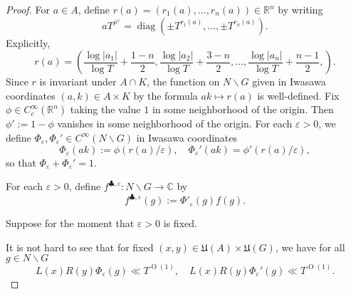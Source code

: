 \documentclass[reqno]{amsart}
\def\eps{\varepsilon}
\DeclareMathOperator{\diag}{diag}
\def\O{\operatorname{O}}
\theoremstyle{plain} \newtheorem{theorem} {Theorem}
\theoremstyle{definition} \newtheorem{definition} [theorem] {Definition}
\theoremstyle{itplain} %
\numberwithin{equation}{section}
\numberwithin{theorem}{section}
\begin{document}
\begin{proof}
  For $a \in A$, define $r(a)  = (r_1(a),\dotsc,r_n(a)) \in \mathbb{R}^n$ by writing
  \begin{equation*}
    a T^{\rho^\vee} = \diag(\pm T^{r_1(a)}, \dotsc, \pm T^{r_n(a)}).
  \end{equation*}
  Explicitly,
  \begin{equation*}
    r(a) =
    \left(
      \frac{\log |a_1|}{\log T} + \frac{1 - n}{2},
      \frac{\log |a_2|}{\log T} + \frac{3 - n}{2},
      \dotsc,
      \frac{\log |a_n|}{\log T} + \frac{n - 1}{2},
    \right).    
  \end{equation*}
  Since $r$ is invariant under $A \cap K$, the function on $N \backslash G$ given in Iwasawa coordinates $(a,k) \in A \times K$ by the formula $a k \mapsto r(a)$ is well-defined.  Fix $\phi \in C_c^\infty(\mathbb{R}^n)$ taking the value $1$ in some neighborhood of the origin.  Then $\phi ' := 1 - \phi$ vanishes in some neighborhood of the origin.  For each $\eps > 0$, we define $\Phi_\eps , \Phi_\eps ' \in C^\infty(N \backslash G)$ in Iwasawa coordinates
  \begin{equation*} 
    \Phi_\eps (a k ) := \phi(r(a)/\eps), \quad
    \Phi_\eps '(a k) = \phi '(r(a) / \eps),
  \end{equation*}
  so that $\Phi_\eps  + \Phi_\eps  ' = 1$.

  For each $\eps > 0$, define $f ^{\clubsuit, \eps} : N \backslash G \rightarrow \mathbb{C}$ by
  \begin{equation*}
    f ^{\clubsuit, \eps }(g) := \Phi'_\eps (g) f(g).
  \end{equation*}

  Suppose for the moment that $\eps > 0$ is fixed.

  It is not hard to see that for fixed $(x,y) \in \mathfrak{U}(A) \times \mathfrak{U}(G)$, we have for all $g \in N \backslash G$
  \begin{equation}\label{eq:lx-ry-phi_eps}
    L(x) R(y) \Phi_\eps (g) \ll T^{\O(1)}, \quad
    L(x) R(y) \Phi_\eps '(g) \ll T^{\O(1)}.
  \end{equation}


\end{proof}
\end{document}
